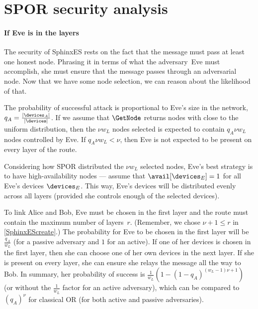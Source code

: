 \section{\acs*{SPOR} security analysis}%
\label{spor-security}

\paragraph*{If Eve is in the layers}

The security of SphinxES rests on the fact that the message must pass at least 
one honest node.
Phrasing it in terms of what the adversary~Eve must accomplish, she must ensure 
that the message passes through an adversarial node.
Now that we have some node selection, we can reason about the likelihood of 
that.

The probability of successful attack is proportional to Eve's size in the 
network, \ie \(q_A = \frac{|\devices_A|}{|\devices|}\).
If we assume that \(\GetNode\) returns nodes with close to the uniform 
distribution, then the \(\nu w_L\) nodes selected is expected to contain \(q_A 
\nu w_L\) nodes controlled by Eve.
If \(q_A \nu w_L < \nu\), then Eve is not expected to be present on every layer 
of the route.

Considering how \ac{SPOR} distributed the \(\nu w_L\) selected nodes, Eve's 
best strategy is to have high-availability nodes --- assume that 
\(\avail[\devices_E] = 1\) for all Eve's devices \(\devices_E\).
This way, Eve's devices will be distributed evenly across all layers (provided 
she controls enough of the selected devices).

To link Alice and Bob, Eve must be chosen in the first layer and the route must 
contain the maximum number of layers~\(r\).
(Remember, we chose \(\nu+1\leq r\) in \cref{SphinxEScreate}.)
The probability for Eve to be chosen in the first layer will be 
\(\frac{q_A}{w_L}\) (for a passive adversary and \(1\) for an active).
If one of her devices is chosen in the first layer, then she can choose one of 
her own devices in the next layer.
If she is present on every layer, she can ensure she relays the message all the 
way to Bob.
In summary, her probability of success is \(
  \frac{1}{w_L} (1-(1-q_A)^{(w_L-1) \nu +1})
\) (or without the \(\frac{1}{w_L}\) factor for an active adversary), which can 
be compared to \((q_A)^\nu\) for classical \ac{OR} (for both active and passive 
adversaries).

